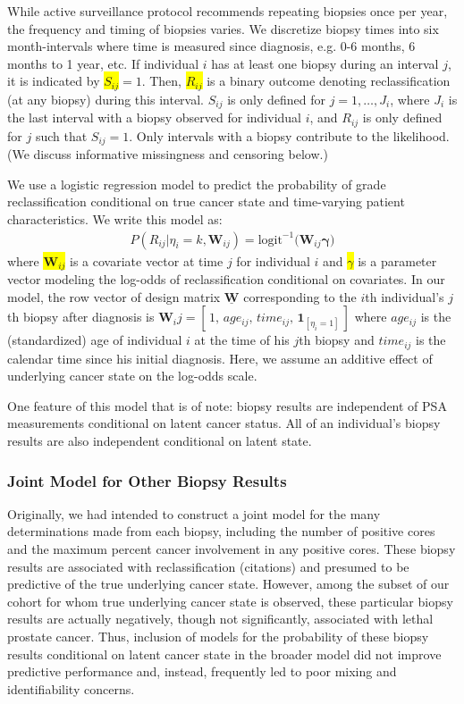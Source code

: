\documentclass[12pt, letterpaper]{article}
\newcommand{\bmgamma}{\boldsymbol{\gamma}}
\newcommand{\bmW}{\mathbf{W}}
\newcommand{\beas}{\begin{eqnarray*}}
\newcommand{\eeas}{\end{eqnarray*}}
\newcommand{\highlight}[1]{\colorbox{yellow}{#1}}
\begin{document}
While active surveillance protocol recommends repeating biopsies once per year, the frequency and timing of biopsies varies. We discretize biopsy times into six month-intervals where time is measured since diagnosis, e.g. 0-6 months, 6 months to 1 year, etc. If individual $i$ has at least one biopsy during an interval $j$, it is indicated by \highlight{$S_{ij}$}$=1$. Then, \highlight{$R_{ij}$} is a binary outcome denoting reclassification (at any biopsy) during this interval. $S_{ij}$ is only defined for $j=1,\dots,J_i$, where $J_i$ is the last interval with a biopsy observed for individual $i$, and $R_{ij}$ is only defined for $j$ such that $S_{ij}=1$. Only intervals with a biopsy contribute to the likelihood. (We discuss informative missingness and censoring below.)

We use a logistic regression model to predict the probability of grade reclassification conditional on true cancer state and time-varying patient characteristics. We write this model as:
\beas
P(R_{ij} | \eta_i=k, \bmW_{ij}) = \text{logit}^{-1}\big( \bmW_{ij}\bmgamma \big)
\eeas
where \highlight{$\bmW_{ij}$} is a covariate vector at time $j$ for individual $i$ and \highlight{$\gamma$} is a parameter vector modeling the log-odds of reclassification conditional on covariates. In our model, the row vector of design matrix $\underline{\bmW}$ corresponding to the $i$th individual's $j$th biopsy after diagnosis is $\bmW_ij=[\,1,\,age_{ij},\,time_{ij},\,\mathbf{1}_{[\eta_i=1]}\,]$ where $age_{ij}$ is the (standardized) age of individual $i$ at the time of his $j$th biopsy and $time_{ij}$ is the calendar time since his initial diagnosis. Here, we assume an additive effect of underlying cancer state on the log-odds scale. 

One feature of this model that is of note: biopsy results are independent of PSA measurements conditional on latent cancer status. All of an individual's biopsy results are also independent conditional on latent state.

\subsubsection{Joint Model for Other Biopsy Results}
Originally, we had intended to construct a joint model for the many determinations made from each biopsy, including the number of positive cores and the maximum percent cancer involvement in any positive cores. These biopsy results are associated with reclassification (citations) and presumed to be predictive of the true underlying cancer state. However, among the subset of our cohort for whom true underlying cancer state is observed, these particular biopsy results are actually negatively, though not significantly, associated with lethal prostate cancer. Thus, inclusion of models for the probability of these biopsy results conditional on latent cancer state in the broader model did not improve predictive performance and, instead, frequently led to poor mixing and identifiability concerns. 
\end{document}
